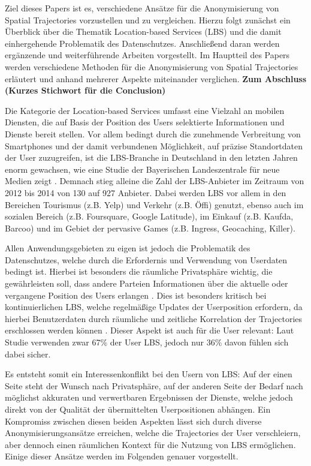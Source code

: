 Ziel dieses Papers ist es, verschiedene Ansätze für die Anonymisierung von Spatial Trajectories vorzustellen und zu vergleichen. Hierzu folgt zunächst ein Überblick über die Thematik Location-based Services (LBS) und die damit einhergehende Problematik des Datenschutzes. Anschließend daran werden ergänzende und weiterführende Arbeiten vorgestellt. Im Hauptteil des Papers werden verschiedene Methoden für die Anonymisierung von Spatial Trajectories erläutert und anhand mehrerer Aspekte miteinander verglichen. \textbf{Zum Abschluss (Kurzes Stichwort für die Conclusion)}

Die Kategorie der Location-based Services umfasst eine Vielzahl an mobilen Diensten, die auf Basis der Position des Users selektierte Informationen und Dienste bereit stellen. Vor allem bedingt durch die zunehmende Verbreitung von Smartphones und der damit verbundenen Möglichkeit, auf präzise Standortdaten der User zuzugreifen, ist die LBS-Branche in Deutschland in den letzten Jahren enorm gewachsen, wie eine Studie der Bayerischen Landeszentrale für neue Medien zeigt \cite{Consulting2014}. Demnach stieg alleine die Zahl der LBS-Anbieter im Zeitraum von 2012 bis 2014 von 130 auf 927 Anbieter. Dabei werden LBS vor allem in den Bereichen Tourismus (z.B. Yelp) und Verkehr (z.B. Öffi) genutzt, ebenso auch im sozialen Bereich (z.B. Foursquare, Google Latitude), im Einkauf (z.B. Kaufda, Barcoo) und im Gebiet der pervasive Games (z.B. Ingress, Geocaching, Killer).

Allen Anwendungsgebieten zu eigen ist jedoch die Problematik des Datenschutzes, welche durch die Erfordernis und Verwendung von Userdaten bedingt ist. Hierbei ist besonders die räumliche Privatsphäre wichtig, die gewährleisten soll, dass andere Parteien Informationen über die aktuelle oder vergangene Position des Users erlangen \cite{Beresford2003}. Dies ist besonders kritisch bei kontinuierlichen LBS, welche regelmäßige Updates der Userposition erfordern, da hierbei Benutzerdaten durch räumliche und zeitliche Korrelation der Trajectories erschlossen werden können \cite{Chow2011}. Dieser Aspekt ist auch für die User relevant: Laut Studie verwenden zwar 67\% der User LBS, jedoch nur 36\% davon fühlen sich dabei sicher.

Es entsteht somit ein Interessenkonflikt bei den Usern von LBS: Auf der einen Seite steht der Wunsch nach Privatsphäre, auf der anderen Seite der Bedarf nach möglichst akkuraten und verwertbaren Ergebnissen der Dienste, welche jedoch direkt von der Qualität der übermittelten Userpositionen abhängen. Ein Kompromiss zwischen diesen beiden Aspekten lässt sich durch diverse Anonymisierungsansätze erreichen, welche die Trajectories der User verschleiern, aber dennoch einen räumlichen Kontext für die Nutzung von LBS ermöglichen. Einige dieser Ansätze werden im Folgenden genauer vorgestellt.